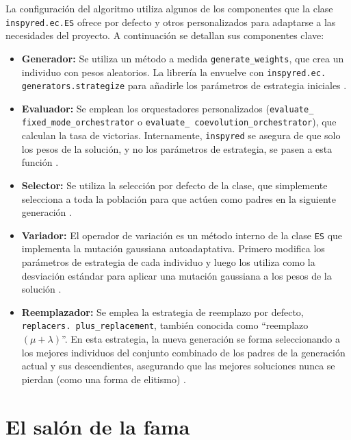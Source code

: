 La configuración del algoritmo utiliza algunos de los componentes que la clase \texttt{inspyred.ec.ES} ofrece por defecto y otros personalizados para adaptarse a las necesidades del proyecto. A continuación se detallan sus componentes clave:
\begin{itemize}
	\item \textbf{Generador:} Se utiliza un método a medida \texttt{generate\_weights}, que crea un individuo con pesos aleatorios. La librería la envuelve con \texttt{inspyred.ec. generators.strategize} para añadirle los parámetros de estrategia iniciales \cite{aaron_garret_library_2025}.
	\item \textbf{Evaluador:} Se emplean los orquestadores personalizados (\texttt{evaluate\_ fixed\_mode\_orchestrator} o \texttt{evaluate\_ coevolution\_orchestrator}), que calculan la tasa de victorias. Internamente, \texttt{inspyred} se asegura de que solo los pesos de la solución, y no los parámetros de estrategia, se pasen a esta función \cite{aaron_garret_library_2025}.
	\item \textbf{Selector:} Se utiliza la selección por defecto de la clase, que simplemente selecciona a toda la población para que actúen como padres en la siguiente generación \cite{aaron_garret_library_2025}.
	\item \textbf{Variador:} El operador de variación es un método interno de la clase \texttt{ES} que implementa la mutación gaussiana autoadaptativa. Primero modifica los parámetros de estrategia de cada individuo y luego los utiliza como la desviación estándar para aplicar una mutación gaussiana a los pesos de la solución \cite{aaron_garret_library_2025}.
	\item \textbf{Reemplazador:} Se emplea la estrategia de reemplazo por defecto, \texttt{replacers. plus\_replacement}, también conocida como ``reemplazo $(\mu + \lambda)$''. En esta estrategia, la nueva generación se forma seleccionando a los mejores individuos del conjunto combinado de los padres de la generación actual y sus descendientes, asegurando que las mejores soluciones nunca se pierdan (como una forma de elitismo) \cite{aaron_garret_library_2025}.
\end{itemize}


\section{El salón de la fama} \label{sec:salon_fama}

